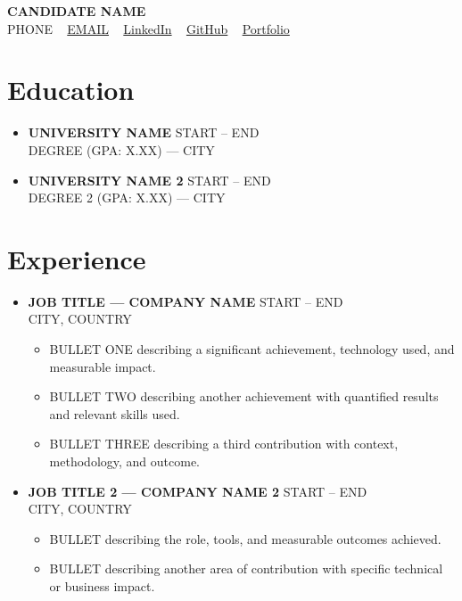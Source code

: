 \documentclass[a4paper,11pt]{article}
\begin{document}
\begin{center}
    {\LARGE \bfseries CANDIDATE NAME} \\[2pt]
    \small
    PHONE ~
    \href{mailto:EMAIL}{EMAIL} ~
    \href{LINKEDIN_URL}{LinkedIn} ~
    \href{GITHUB_URL}{GitHub} ~
    \href{PORTFOLIO_URL}{Portfolio}
\end{center}
\vspace{-6pt}
\section{Education}
\begin{itemize}
    \item \textbf{UNIVERSITY NAME} \hfill START -- END \\
    DEGREE (GPA: X.XX) --- CITY
    \item \textbf{UNIVERSITY NAME 2} \hfill START -- END \\
    DEGREE 2 (GPA: X.XX) --- CITY
\end{itemize}
\section{Experience}
\begin{itemize}
\item \textbf{JOB TITLE --- COMPANY NAME} \hfill START -- END \\
CITY, COUNTRY
\begin{itemize}
    \item BULLET ONE describing a significant achievement, technology used, and measurable impact.
    \item BULLET TWO describing another achievement with quantified results and relevant skills used.
    \item BULLET THREE describing a third contribution with context, methodology, and outcome.
\end{itemize}
\item \textbf{JOB TITLE 2 --- COMPANY NAME 2} \hfill START -- END \\
CITY, COUNTRY
\begin{itemize}
    \item BULLET describing the role, tools, and measurable outcomes achieved.
    \item BULLET describing another area of contribution with specific technical or business impact.
\end{itemize}
\end{itemize}
\end{document}
